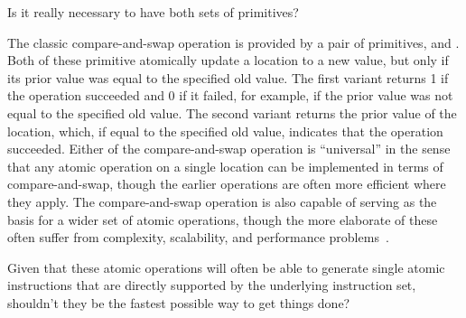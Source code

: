 \QuickQuiz{}
	Is it really necessary to have both sets of primitives?
 \QuickQuizEnd

The classic compare-and-swap operation is provided by a pair of
primitives,  and
.
Both of these primitive atomically update a location to a new value,
but only if its prior value was equal to the specified old value.
The first variant returns 1 if the operation succeeded and 0 if it
failed, for example, if the prior value was not equal to the specified
old value.
The second variant returns the prior value of the location, which, if
equal to the specified old value, indicates that the operation succeeded.
Either of the compare-and-swap operation is ``universal'' in the sense
that any atomic operation on a single location can be implemented in
terms of compare-and-swap, though the earlier operations are often
more efficient where they apply.
The compare-and-swap operation is also capable of serving as the basis
for a wider set of atomic operations, though the more elaborate of
these often suffer from complexity, scalability, and performance
problems~\cite{MauriceHerlihy90a}.

\QuickQuiz{}
	Given that these atomic operations will often be able to
	generate single atomic instructions that are directly
	supported by the underlying instruction set, shouldn't
	they be the fastest possible way to get things done?
 \QuickQuizEnd

